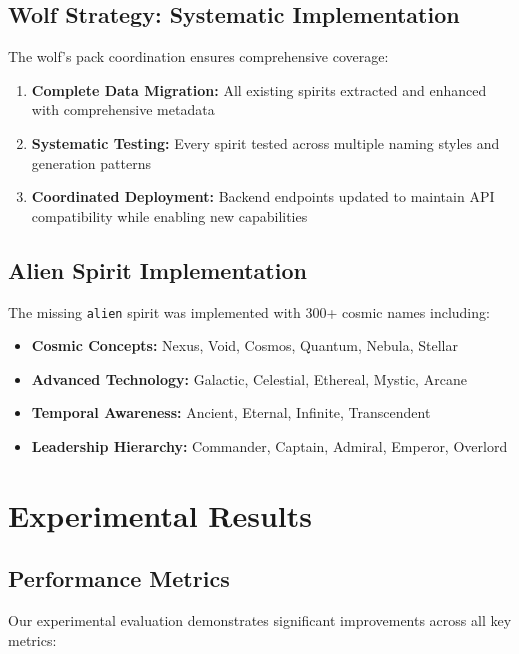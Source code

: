 \documentclass[11pt,a4paper]{article}
\begin{document}
\subsection{Wolf Strategy: Systematic Implementation}

The wolf's pack coordination ensures comprehensive coverage:

\begin{enumerate}
    \item \textbf{Complete Data Migration:} All existing spirits extracted and enhanced with comprehensive metadata
    \item \textbf{Systematic Testing:} Every spirit tested across multiple naming styles and generation patterns
    \item \textbf{Coordinated Deployment:} Backend endpoints updated to maintain API compatibility while enabling new capabilities
\end{enumerate}

\subsection{Alien Spirit Implementation}

The missing \texttt{alien} spirit was implemented with 300+ cosmic names including:

\begin{itemize}
    \item \textbf{Cosmic Concepts:} Nexus, Void, Cosmos, Quantum, Nebula, Stellar
    \item \textbf{Advanced Technology:} Galactic, Celestial, Ethereal, Mystic, Arcane
    \item \textbf{Temporal Awareness:} Ancient, Eternal, Infinite, Transcendent
    \item \textbf{Leadership Hierarchy:} Commander, Captain, Admiral, Emperor, Overlord
\end{itemize}

\section{Experimental Results}

\subsection{Performance Metrics}

Our experimental evaluation demonstrates significant improvements across all key metrics:
\end{document}
